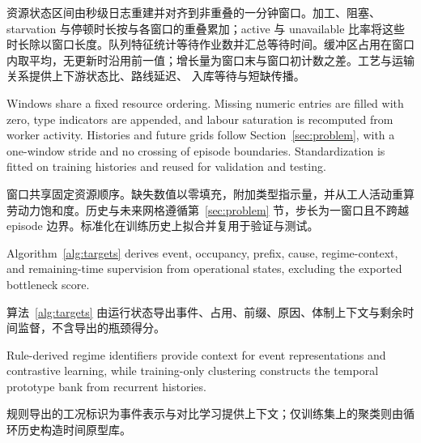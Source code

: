 \documentclass[a4paper,fleqn]{cas-dc}
\newcommand{\zhpara}[1]{%
  \par\begingroup\small\color{black!72}\noindent #1\par\endgroup}
\begin{document}
\zhpara{资源状态区间由秒级日志重建并对齐到非重叠的一分钟窗口。加工、阻塞、starvation 与停顿时长按与各窗口的重叠累加；active 与 unavailable 比率将这些时长除以窗口长度。队列特征统计等待作业数并汇总等待时间。缓冲区占用在窗口内取平均，无更新时沿用前一值；增长量为窗口末与窗口初计数之差。工艺与运输关系提供上下游状态比、路线延迟、 入库等待与短缺传播。}


Windows share a fixed resource ordering. Missing numeric entries are filled with zero, type indicators are appended, and labour saturation is recomputed from worker activity. Histories and future grids follow Section~\ref{sec:problem}, with a one-window stride and no crossing of episode boundaries. Standardization is fitted on training histories and reused for validation and testing.

\zhpara{窗口共享固定资源顺序。缺失数值以零填充，附加类型指示量，并从工人活动重算劳动力饱和度。历史与未来网格遵循第~\ref{sec:problem} 节，步长为一窗口且不跨越 episode 边界。标准化在训练历史上拟合并复用于验证与测试。}


Algorithm~\ref{alg:targets} derives event, occupancy, prefix, cause, regime-context, and remaining-time supervision from operational states, excluding the exported bottleneck score.

\zhpara{算法~\ref{alg:targets} 由运行状态导出事件、占用、前缀、原因、体制上下文与剩余时间监督，不含导出的瓶颈得分。}


Rule-derived regime identifiers provide context for event representations and contrastive learning, while training-only clustering constructs the temporal prototype bank from recurrent histories.

\zhpara{规则导出的工况标识为事件表示与对比学习提供上下文；仅训练集上的聚类则由循环历史构造时间原型库。}
\end{document}
